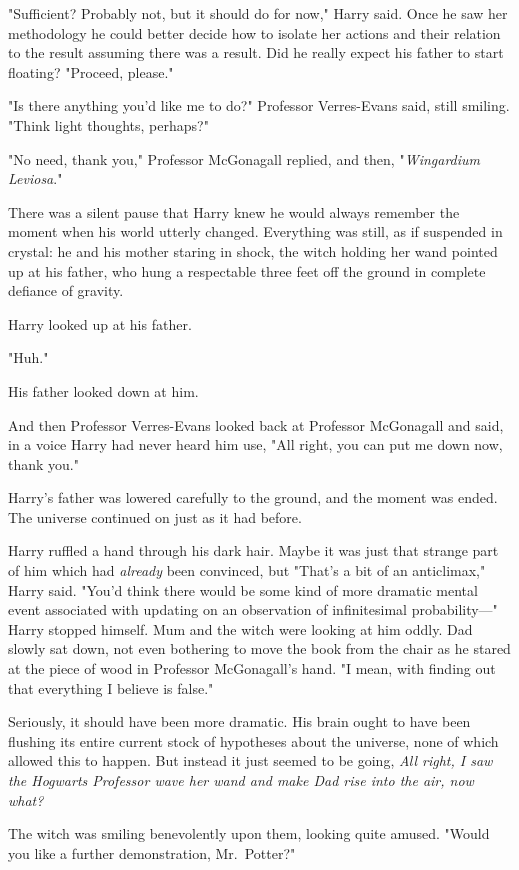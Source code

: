 "Sufficient? Probably not, but it should do for now," Harry
said. Once he saw her methodology he could better decide
how to isolate her actions and their relation to the result{\el}
assuming there was a result. Did he really expect his
father to start floating? "Proceed, please."

"Is there anything you'd like me to do?" Professor
Verres-Evans said, still smiling. "Think light thoughts,
perhaps?"

"No need, thank you," Professor McGonagall replied, and
then, "\emph{Wingardium Leviosa}."

There was a silent pause that Harry knew he would
always remember{\el} the moment when his world utterly
changed. Everything was still, as if suspended in crystal:
he and his mother staring in shock, the witch holding her
wand pointed up at his father, who hung a respectable
three feet off the ground in complete defiance of gravity.

Harry looked up at his father.

"Huh."

His father looked down at him.

And then Professor Verres-Evans looked back at Professor
McGonagall and said, in a voice Harry had never heard him
use, "All right, you can put me down now, thank you."

Harry's father was lowered carefully to the ground, and the
moment was ended. The universe continued on just as it had before.

Harry ruffled a hand through his dark hair. Maybe it was
just that strange part of him which had \emph{already} been
convinced, but{\el} "That's a bit of an anticlimax," Harry said.
"You'd think there would be some kind of more dramatic
mental event associated with updating on an observation of
infinitesimal probability—" Harry stopped himself. Mum and
the witch were looking at him oddly. Dad slowly sat down,
not even bothering to move the book from the chair as
he stared at the piece of wood in Professor McGonagall's
hand. "I mean, with finding out that everything I believe is false."

Seriously, it should have been more dramatic. His brain
ought to have been flushing its entire current stock of
hypotheses about the universe, none of which allowed this
to happen. But instead it just seemed to be going, \emph{All
right, I saw the Hogwarts Professor wave her wand and
make Dad rise into the air, now what?}

The witch was smiling benevolently upon them, looking
quite amused. "Would you like a further demonstration, Mr.~Potter?"

